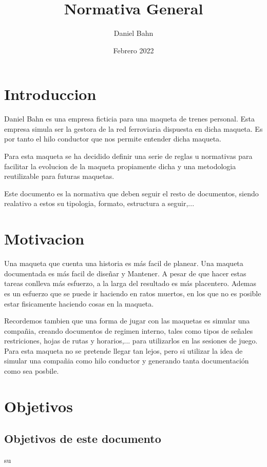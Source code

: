 \documentclass{DccDiyTools/DccDiyTools}
\title{Normativa General}
\author{Daniel Bahn}
\date{Febrero 2022}
\begin{document}
\maketitle
\newpage
\section{Introduccion}
Daniel Bahn es una empresa ficticia para una maqueta de trenes personal. Esta empresa simula ser la gestora de la red ferroviaria dispuesta en dicha maqueta.
Es por tanto el hilo conductor que nos permite entender dicha maqueta.

Para esta maqueta se ha decidido definir una serie de reglas u normativas para facilitar la evolucion de la maqueta propiamente dicha y una metodologia
reutilizable para futuras maquetas.

Este documento es la normativa que deben seguir el resto de documentos, siendo realativo a estos su tipologia, formato, estructura a seguir,...

\section{Motivacion} 
Una maqueta que cuenta una historia es más facil de planear. Una maqueta documentada es más facil de diseñar y Mantener. A pesar de que hacer estas
tareas conlleva más esfuerzo, a la larga del resultado es más placentero. Ademas es un esfuerzo que se puede ir haciendo en ratos muertos, en los que 
no es posible estar fisicamente haciendo cosas en la maqueta.

Recordemos tambien que una forma de jugar con las maquetas es simular una compañia, creando documentos de regimen interno, tales como tipos de señales
restriciones, hojas de rutas y horarios,... para utilizarlos en las sesiones de juego. Para esta maqueta no se pretende llegar tan lejos, pero si
utilizar la idea de simular una compañia como hilo conductor y generando tanta documentación como sea posbile.


\newpage
\section{Objetivos}
\subsection{Objetivos de este documento}
su

\end{document}
